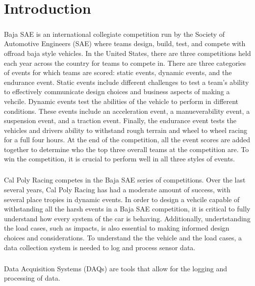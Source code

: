 \chapter{Introduction}

\paragraph{}
Baja SAE is an international collegiate competition run by the Society of Automotive Engineers (SAE) where teams design, build, test, and compete with offroad baja style vehicles.
In the United States, there are three competitions held each year across the country for teams to compete in. 
There are three categories of events for which teams are scored: static events, dynamic events, and the endurance event.  
Static events include different challenges to test a team's ability to effectively communicate design choices and business aspects of making a vehcile.  
Dynamic events test the abilities of the vehicle to perform in different conditions.  
These events include an acceleration event, a manueverability event, a suspension event, and a traction event.  
Finally, the endurance event tests the vehicles and drivers ability to withstand rough terrain and wheel to wheel racing for a full four hours.
At the end of the competition, all the event scores are added together to determine who the top three overall teams at the competition are.
To win the competition, it is crucial to perform well in all three styles of events.

\paragraph{}
Cal Poly Racing competes in the Baja SAE series of competitions.
Over the last several years, Cal Poly Racing has had a moderate amount of success, with several place tropies in dynamic events.
In order to design a vehcile capable of withstanding all the harsh events in a Baja SAE competition, it is critical to fully understand how every system of the car is behaving.
Additionally, undertstanding the load cases, such as impacts, is also essential to making informed design choices and considerations.
To understand the the vehicle and the load cases, a data collection system is needed to log and process sensor data.

\paragraph{}
Data Acquisition Systems (DAQs) are tools that allow for the logging and processing of data.

\paragraph{}

